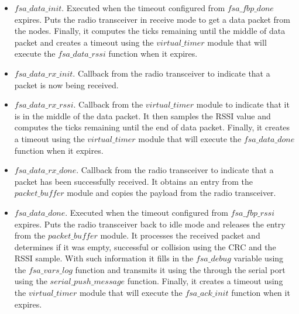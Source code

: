 \begin{itemize}
\item $fsa\_data\_init$. Executed when the timeout configured from $fsa\_fbp\_done$ expires. Puts the radio transceiver in receive mode to get a data packet from the nodes. Finally, it computes the ticks remaining until the middle of data packet and creates a timeout using the $virtual\_timer$ module that will execute the $fsa\_data\_rssi$ function when it expires.
\item $fsa\_data\_rx\_init$. Callback from the radio transceiver to indicate that a packet is now being received.
\item $fsa\_data\_rx\_rssi$. Callback from the $virtual\_timer$ module to indicate that it is in the middle of the data packet. It then samples the RSSI value and computes the ticks remaining until the end of data packet. Finally, it creates a timeout using the $virtual\_timer$ module that will execute the $fsa\_data\_done$ function when it expires.
\item $fsa\_data\_rx\_done$. Callback from the radio transceiver to indicate that a packet has been successfully received. It obtains an entry from the $packet\_buffer$ module and copies the payload from the radio transceiver.
\item $fsa\_data\_done$. Executed when the timeout configured from $fsa\_fbp\_rssi$ expires. Puts the radio transceiver back to idle mode and releases the entry from the $packet\_buffer$ module. It processes the received packet and determines if it was empty, successful or collision using the CRC and the RSSI sample. With such information it fills in the $fsa\_debug$ variable using the $fsa\_vars\_log$ function and transmits it using the through the serial port using the $serial\_push\_message$ function. Finally, it creates a timeout using the $virtual\_timer$ module that will execute the $fsa\_ack\_init$ function when it expires.


\end{itemize}
